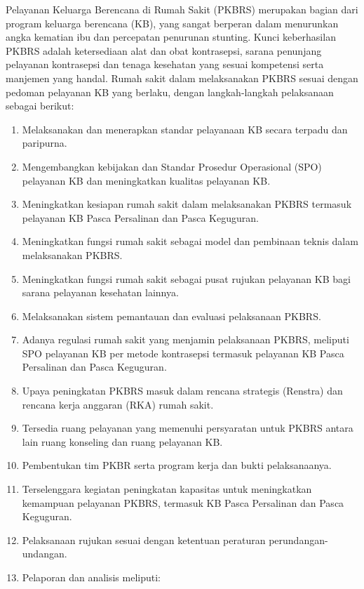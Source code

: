 \documentclass[
]{book}
\providecommand{\tightlist}{%
  \setlength{\itemsep}{0pt}\setlength{\parskip}{0pt}}
\begin{document}
Pelayanan Keluarga Berencana di Rumah Sakit (PKBRS) merupakan bagian dari program keluarga berencana (KB), yang sangat berperan dalam menurunkan angka kematian ibu dan percepatan penurunan stunting. Kunci keberhasilan PKBRS adalah ketersediaan alat dan obat kontrasepsi, sarana penunjang pelayanan kontrasepsi dan tenaga kesehatan yang sesuai kompetensi serta manjemen yang handal. Rumah sakit dalam melaksanakan PKBRS sesuai dengan pedoman pelayanan KB yang berlaku, dengan langkah-langkah pelaksanaan sebagai berikut:

\begin{enumerate}
\def\labelenumi{\arabic{enumi}.}
\tightlist
\item
  Melaksanakan dan menerapkan standar pelayanaan KB secara terpadu dan paripurna.
\item
  Mengembangkan kebijakan dan Standar Prosedur Operasional (SPO) pelayanan KB dan meningkatkan kualitas pelayanan KB.
\item
  Meningkatkan kesiapan rumah sakit dalam melaksanakan PKBRS termasuk pelayanan KB Pasca Persalinan dan Pasca Keguguran.
\item
  Meningkatkan fungsi rumah sakit sebagai model dan pembinaan teknis dalam melaksanakan PKBRS.
\item
  Meningkatkan fungsi rumah sakit sebagai pusat rujukan pelayanan KB bagi sarana pelayanan kesehatan lainnya.
\item
  Melaksanakan sistem pemantauan dan evaluasi pelaksanaan PKBRS.
\item
  Adanya regulasi rumah sakit yang menjamin pelaksanaan PKBRS, meliputi SPO pelayanan KB per metode kontrasepsi termasuk pelayanan KB Pasca Persalinan dan Pasca Keguguran.
\item
  Upaya peningkatan PKBRS masuk dalam rencana strategis (Renstra) dan rencana kerja anggaran (RKA) rumah sakit.
\item
  Tersedia ruang pelayanan yang memenuhi persyaratan untuk PKBRS antara lain ruang konseling dan ruang pelayanan KB.
\item
  Pembentukan tim PKBR serta program kerja dan bukti pelaksanaanya.
\item
  Terselenggara kegiatan peningkatan kapasitas untuk meningkatkan kemampuan pelayanan PKBRS, termasuk KB Pasca Persalinan dan Pasca Keguguran.
\item
  Pelaksanaan rujukan sesuai dengan ketentuan peraturan perundangan-undangan.
\item
  Pelaporan dan analisis meliputi:
\end{enumerate}
\end{document}
